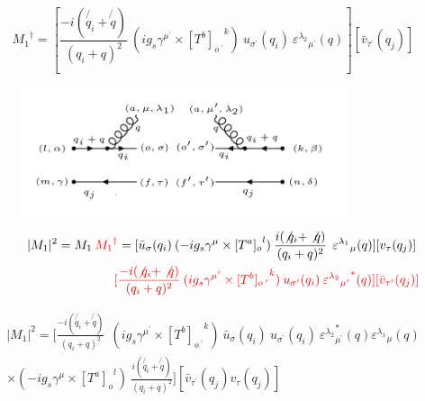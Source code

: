 \begin{equation}
{M_1}^{\dagger} = [\frac{-i(\not{q_i} + \not{q})}{(q_i + q)^2} \:  (ig_s \gamma^{{\mu}^{\prime}}\times {[T^b]_{o\:^{\prime}}}^k) \: u_{{\sigma}^{\prime}}(q_i) \: {\varepsilon^{\lambda_2}}_{{\mu}^{\prime}} (q)][{\bar{v}}_{{\tau}^{\prime}}(q_j)]
\end{equation}

\begin{figure}[h!]
\centering
\includegraphics[width=0.85\textwidth]{images/qgqbarMSquer.png}
\end{figure}

\begin{equation}
\begin{split}
|M_1|^2=M_1\:{\color[RGB]{255,0,0} {M_1}^{\dagger}} = [{\bar{u}}_{\sigma}(q_i)\: (-ig_s \gamma^{\mu}\times {[T^a]_o}^l) \: \frac{i(\not{q_i} + \not{q})}{(q_i + q)^2}\:\: {\varepsilon^{\lambda_1}}_{\mu} (q)] [{v}_{\tau}(q_j)]\: \\
\quad\quad\quad\quad\quad\quad\quad\quad\:\:{\color[RGB]{255,0,0}[\frac{-i(\not{q_i} + \not{q})}{(q_i + q)^2} \:  (ig_s \gamma^{{\mu}^{\prime}}\times {[T^b]_{o\:^{\prime}}}^k) \: u_{{\sigma}^{\prime}}(q_i) \: {{\varepsilon^{\lambda_2}}_{{\mu}^{\prime}}}^* (q)][{\bar{v}}_{{\tau}^{\prime}}(q_j)]}
\end{split}
\end{equation}


\begin{equation}
\begin{split}
|M_1|^2=[\frac{-i(\not{q_i} + \not{q})}{(q_i + q)^2} \:
 \:  (ig_s \gamma^{{\mu}^{\prime}}\times {[T^b]_{o\:^{\prime}}}^k) \: {\bar{u}}_{\sigma}(q_i)\:u_{{\sigma}^{\prime}}(q_i) \: {{\varepsilon^{\lambda_2}}_{{\mu}^{\prime}}^* (q) {\varepsilon^{\lambda_1}}_{\mu} (q)} \\
\times (-ig_s \gamma^{\mu}\times {[T^a]_o}^l) \: \frac{i(\not{q_i} + \not{q})}{(q_i + q)^2} ]
[{\bar{v}}_{{\tau}^{\prime}}(q_j) {v}_{\tau}(q_j)]
\end{split}
\end{equation}

